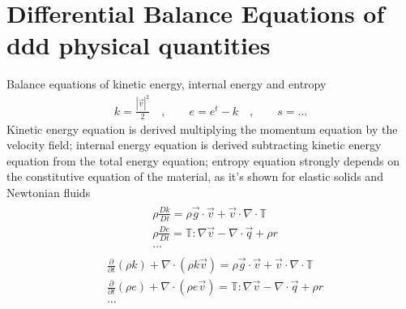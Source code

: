 \documentclass[letterpaper,10pt,english]{jupyterBook}
\begin{document}
\section{Differential Balance Equations of ddd physical quantities}
\label{\detokenize{ch/continuum/balance-derived-differential:differential-balance-equations-of-ddd-physical-quantities}}\label{\detokenize{ch/continuum/balance-derived-differential:continuum-governing-equations-primary-integral}}\label{\detokenize{ch/continuum/balance-derived-differential::doc}}
\sphinxAtStartPar
Balance equations of kinetic energy, internal energy and entropy
\begin{equation*}
\begin{split}k = \frac{|\vec{v}|^2}{2} \quad , \qquad e = e^t - k \quad , \qquad s = \dots\end{split}
\end{equation*}
\sphinxAtStartPar
{} Kinetic energy equation is derived multiplying the momentum equation by the velocity field; internal energy equation is derived subtracting kinetic energy equation from the total energy equation; entropy equation strongly depends on the constitutive equation of the material, as it’s shown for elastic solids and Newtonian fluids
\begin{equation*}
\begin{split}\begin{aligned}
 & \rho \frac{D k}{D t} = \rho \vec{g} \cdot \vec{v} + \vec{v} \cdot \nabla \cdot \mathbb{T} \\
 & \rho \frac{D e}{D t} = \mathbb{T} : \nabla \vec{v} - \nabla \cdot \vec{q} + \rho r \\
 & \dots
\end{aligned}\end{split}
\end{equation*}
\sphinxAtStartPar
{}
\begin{equation*}
\begin{split}\begin{aligned}
 & \frac{\partial }{\partial t}\left(\rho k\right) + \nabla \cdot \left( \rho k \vec{v} \right) = \rho \vec{g} \cdot \vec{v} + \vec{v} \cdot \nabla \cdot \mathbb{T} \\
 & \frac{\partial }{\partial t}\left(\rho e\right) + \nabla \cdot \left( \rho e \vec{v} \right) = \mathbb{T} : \nabla \vec{v} - \nabla \cdot \vec{q} + \rho r \\
 & \dots
\end{aligned}\end{split}
\end{equation*}
\end{document}
